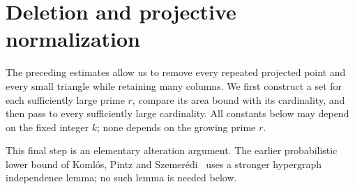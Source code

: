 \section{Deletion and projective normalization}\label{alt:section}

The preceding estimates allow us to remove every repeated projected point
and every small triangle while retaining many columns. We first construct
a set for each sufficiently large prime $r$, compare its area bound with
its cardinality, and then pass to every sufficiently large cardinality.
All constants below may depend on the fixed integer $k$; none depends on
the growing prime $r$.

This final step is an elementary alteration argument. The earlier
probabilistic lower bound of Koml\'os, Pintz and
Szemer\'edi~\cite{KPS1982} uses a stronger hypergraph independence lemma;
no such lemma is needed below.


